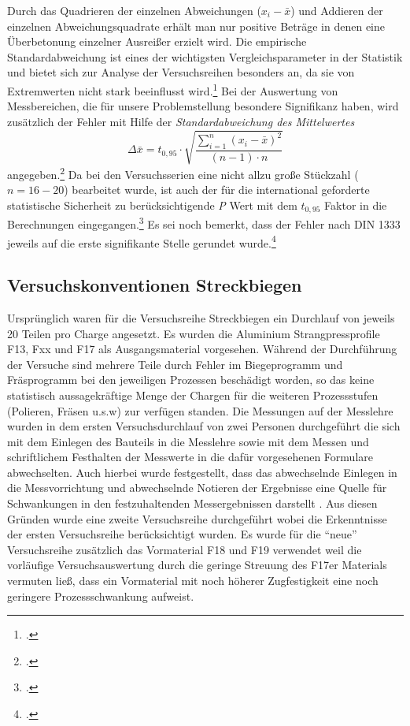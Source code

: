 \documentclass[12pt,a4paper,parskip]{scrartcl}
\begin{document}
\medskip

Durch das Quadrieren der einzelnen Abweichungen ($ x_i-\bar{x}$) und Addieren der einzelnen Abweichungsquadrate erhält man nur positive Beträge in denen eine Überbetonung einzelner Ausreißer erzielt wird.
Die empirische Standardabweichung ist   eines der wichtigsten Vergleichsparameter in der Statistik und bietet sich zur Analyse der Versuchsreihen besonders an, da sie von Extremwerten nicht stark beeinflusst wird.\footcite[Vgl.][54]{gst} Bei der Auswertung von Messbereichen, die für unsere Problemstellung besondere Signifikanz haben, wird zusätzlich der Fehler mit Hilfe der  \emph{Standardabweichung des Mittelwertes}  \begin{equation} \Delta\bar{x}= t_{0,95} \cdot \sqrt{\frac{\sum \limits_{i=1}^n (x_i - \bar{x})^2}{(n-1)\cdot n}}\end{equation}  angegeben.\footcite[Vgl.][16]{ph} Da bei den Versuchsserien eine nicht allzu große Stückzahl ($ n=16-20 $) bearbeitet wurde,  ist auch der für die international geforderte statistische Sicherheit zu berücksichtigende \emph{P} Wert mit dem $ t_{0,95} $ Faktor in die Berechnungen eingegangen.\footcite[Vgl.][609]{tp}  Es sei noch bemerkt, dass der Fehler nach DIN 1333 jeweils auf die erste signifikante Stelle gerundet wurde.\footcite[Vgl.][612]{tp}
 	 	
 	

 	
\subsection{Versuchskonventionen Streckbiegen}
Ursprünglich waren für die Versuchsreihe Streckbiegen ein Durchlauf von jeweils 20 Teilen pro Charge angesetzt. Es wurden die Aluminium Strangpressprofile F13, Fxx und F17 als Ausgangsmaterial vorgesehen. Während der Durchführung der Versuche sind mehrere Teile durch Fehler im Biegeprogramm und Fräsprogramm bei den jeweiligen Prozessen beschädigt worden, so das keine statistisch aussagekräftige Menge  der Chargen für die weiteren Prozessstufen (Polieren, Fräsen u.s.w) zur verfügen standen. Die Messungen auf der Messlehre wurden in dem ersten Versuchsdurchlauf von zwei Personen durchgeführt die sich mit dem Einlegen des Bauteils in die Messlehre sowie mit dem Messen und schriftlichem Festhalten der Messwerte in die dafür vorgesehenen Formulare abwechselten. Auch hierbei wurde festgestellt, dass das abwechselnde Einlegen in die Messvorrichtung und abwechselnde Notieren der Ergebnisse eine Quelle für Schwankungen in den festzuhaltenden Messergebnissen darstellt . Aus diesen Gründen wurde eine zweite Versuchsreihe durchgeführt wobei die Erkenntnisse der ersten Versuchsreihe berücksichtigt wurden. Es wurde für die "`neue"' Versuchsreihe zusätzlich das Vormaterial F18 und F19 verwendet weil die vorläufige Versuchsauswertung durch die geringe Streuung des F17er Materials vermuten ließ, dass ein Vormaterial mit noch höherer Zugfestigkeit eine noch geringere Prozessschwankung aufweist.
\end{document}
